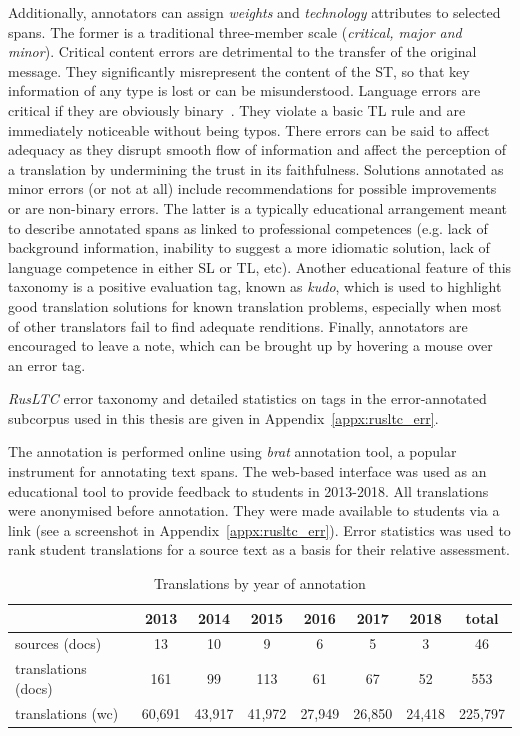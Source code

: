Additionally, annotators can assign \textit{weights} and \textit{technology} attributes to selected spans. The former is a traditional three-member scale (\textit{critical, major and minor}). Critical content errors are detrimental to the transfer of the original message. They significantly misrepresent the content of the ST, so that key information of any type is lost or can be misunderstood. Language errors are critical if they are obviously binary~\cite{Pym1992}. They violate a basic TL rule and are immediately noticeable without being typos. There errors can be said to affect adequacy as they disrupt smooth flow of information and affect the perception of a translation by undermining the trust in its faithfulness. Solutions annotated as minor errors (or not at all) include recommendations for possible improvements or are non-binary errors.
The latter is a typically educational arrangement meant to describe annotated spans as linked to professional competences (e.g. lack of background information, inability to suggest a more idiomatic solution, lack of language competence in either SL or TL, etc). Another educational feature of this taxonomy is a positive evaluation tag, known as \textit{kudo}, which is used to highlight good translation solutions for known translation problems, especially when most of other translators fail to find adequate renditions. 
Finally, annotators are encouraged to leave a note, which can be brought up by hovering a mouse over an error tag. 

\textit{RusLTC} error taxonomy and detailed statistics on tags in the error-annotated subcorpus used in this thesis are given in Appendix~\ref{appx:rusltc_err}.

The annotation is performed online using \textit{brat} annotation tool, a popular instrument for annotating text spans. The web-based interface was used as an educational tool to provide feedback to students in 2013-2018. All translations were anonymised before annotation. They were made available to students via a link (see a screenshot in Appendix~\ref{appx:rusltc_err}).   
Error statistics was used to rank student translations for a source text as a basis for their relative assessment.

\begin{table}[H]
	\centering
	\begin{tabular}{l|c|c|c|c|c|c|c}
		\toprule
		
		&   2013  &   2014  & 2015  &  2016  & 2017  & 2018 & total \\
		\midrule				
		sources (docs)      & 13 & 10 & 9 &  6 & 5 & 3 & 46 \\
		translations (docs) & 161  & 99 & 113 & 61  & 67 &  52 & 553 \\
		translations (wc)   & 60,691 & 43,917 & 41,972 & 27,949  & 26,850 & 24,418 & 225,797 \\
		\bottomrule
	\end{tabular}
	\caption{\label{tab:by_year}Translations by year of annotation}
\end{table} 

